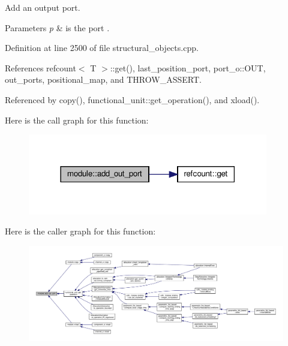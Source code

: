 Add an output port. 


\begin{DoxyParams}{Parameters}
{\em p} & is the port . \\
\hline
\end{DoxyParams}


Definition at line 2500 of file structural\+\_\+objects.\+cpp.



References refcount$<$ T $>$\+::get(), last\+\_\+position\+\_\+port, port\+\_\+o\+::\+O\+UT, out\+\_\+ports, positional\+\_\+map, and T\+H\+R\+O\+W\+\_\+\+A\+S\+S\+E\+RT.



Referenced by copy(), functional\+\_\+unit\+::get\+\_\+operation(), and xload().

Here is the call graph for this function\+:
\nopagebreak
\begin{figure}[H]
\begin{center}
\leavevmode
\includegraphics[width=297pt]{d0/dd3/classmodule_aec52e66f2e98e3ae59f99b20a7760718_cgraph}
\end{center}
\end{figure}
Here is the caller graph for this function\+:
\nopagebreak
\begin{figure}[H]
\begin{center}
\leavevmode
\includegraphics[width=350pt]{d0/dd3/classmodule_aec52e66f2e98e3ae59f99b20a7760718_icgraph}
\end{center}
\end{figure}
\mbox{\label{classmodule_a6130db731833921a393839886b74fcd5}} 
